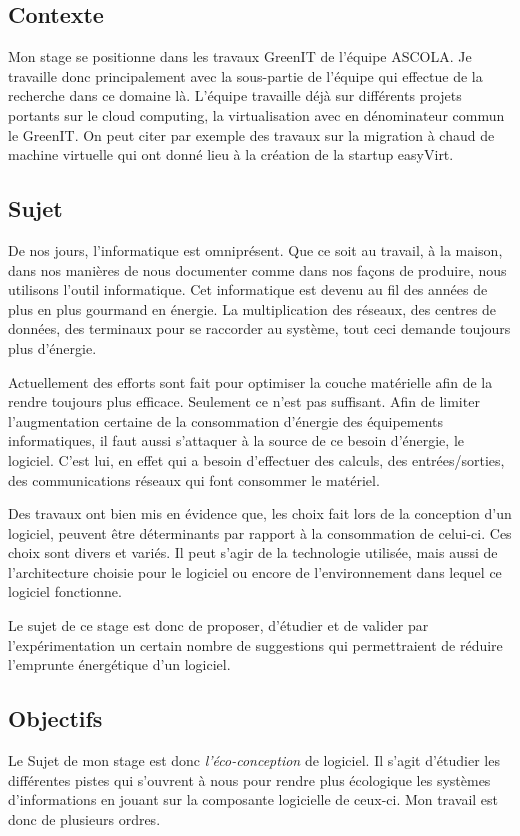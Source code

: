 \documentclass[a4paper, 11pt]{report}
\begin{document}
		\subsection{Contexte}
Mon stage se positionne dans les travaux GreenIT de l’équipe ASCOLA. Je travaille donc principalement avec la sous-partie de l'équipe qui effectue de la recherche dans ce domaine là. L'équipe travaille déjà sur différents projets portants sur le cloud computing, la virtualisation avec en dénominateur commun le GreenIT. On peut citer par exemple des travaux sur la migration à chaud de machine virtuelle qui ont donné lieu à la création de la startup easyVirt.

		\subsection{Sujet}
De nos jours, l'informatique est omniprésent. Que ce soit au travail, à la maison, dans nos manières de nous documenter comme dans nos façons de produire, nous utilisons l'outil informatique. Cet informatique est devenu au fil des années de plus en plus gourmand en énergie. La multiplication des réseaux, des centres de données, des terminaux pour se raccorder au système, tout ceci demande toujours plus d'énergie.

Actuellement des efforts sont fait pour optimiser la couche matérielle afin de la rendre toujours plus efficace. Seulement ce n'est pas suffisant. Afin de limiter l'augmentation certaine de la consommation d'énergie des équipements informatiques, il faut aussi s'attaquer à la source de ce besoin d'énergie, le logiciel. C'est lui, en effet qui a besoin d'effectuer des calculs, des entrées/sorties, des communications réseaux qui font consommer le matériel.

Des travaux ont bien mis en évidence que, les choix fait lors de la conception d'un logiciel, peuvent être déterminants par rapport à la consommation de celui-ci. Ces choix sont divers et variés. Il peut s'agir de la technologie utilisée, mais aussi de l'architecture choisie pour le logiciel ou encore de l'environnement dans lequel ce logiciel fonctionne.

Le sujet de ce stage est donc de proposer, d'étudier et de valider par l'expérimentation un certain nombre de suggestions qui permettraient de réduire l'emprunte énergétique d'un logiciel.

		\subsection{Objectifs}
Le Sujet de mon stage est donc \textit{l'éco-conception} de logiciel. Il s'agit d'étudier les différentes pistes qui s'ouvrent à nous pour rendre plus écologique les systèmes d'informations en jouant sur la composante logicielle de ceux-ci. Mon travail est donc de plusieurs ordres.
\end{document}
